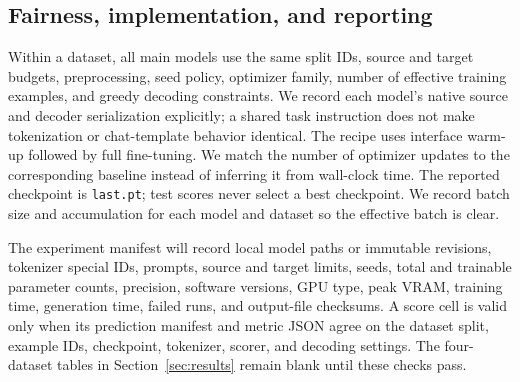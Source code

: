 \subsection{Fairness, implementation, and reporting}
\label{sec:fairness}

Within a dataset, all main models use the same split IDs, source and target
budgets, preprocessing, seed policy, optimizer family, number of effective
training examples, and greedy decoding constraints.  We record each model's
native source and decoder serialization explicitly; a shared task instruction
does not make tokenization or chat-template behavior identical.  The \AFMR
recipe uses interface warm-up followed by full fine-tuning.  We match the
number of optimizer updates to the corresponding baseline instead of inferring
it from wall-clock time.  The reported checkpoint is \texttt{last.pt}; test
scores never select a best checkpoint.  We record batch size and accumulation
for each model and dataset so the effective batch is clear.

The experiment manifest will record local model paths or immutable revisions,
tokenizer special IDs, prompts, source and target limits, seeds, total and
trainable parameter counts, precision, software versions, GPU type, peak VRAM,
training time, generation time, failed runs, and output-file checksums.  A score
cell is valid only when its prediction manifest and metric JSON agree on the
dataset split, example IDs, checkpoint, tokenizer, scorer, and decoding
settings.  The four-dataset tables in Section~\ref{sec:results} remain blank
until these checks pass.
